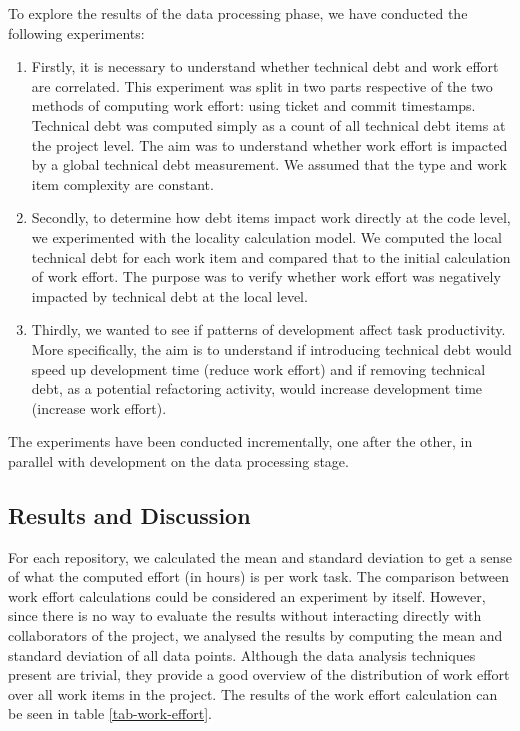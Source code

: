 \documentclass{mpaper}
\begin{document}
To explore the results of the data processing phase, we have conducted the
following experiments:

\begin{enumerate}
  
  \item Firstly, it is necessary to understand whether technical debt and work
  effort are correlated. This experiment was split in two parts respective of
  the two methods of computing work effort: using ticket and commit timestamps.
  Technical debt was computed simply as a count of all technical debt items at
  the project level. The aim was to understand whether work effort is impacted
  by a global technical debt measurement. We assumed that the type and work item
  complexity are constant.

  \item Secondly, to determine how debt items impact work directly at the code
  level, we experimented with the locality calculation model. We computed the
  local technical debt for each work item and compared that to the initial
  calculation of work effort. The purpose was to verify whether work effort was
  negatively impacted by technical debt at the local level. 
  
  \item Thirdly, we wanted to see if patterns of development affect task
  productivity. More specifically, the aim is to understand if introducing
  technical debt would speed up development time (reduce work effort) and if
  removing technical debt, as a potential refactoring activity, would increase
  development time (increase work effort).
\end{enumerate}

The experiments have been conducted incrementally, one after the other, in
parallel with development on the data processing stage.  

\subsection{Results and Discussion}
\label{results-discussion}

For each repository, we calculated the mean and standard deviation to get a
sense of what the computed effort (in hours) is per work task. The comparison
between work effort calculations could be considered an experiment by itself.
However, since there is no way to evaluate the results without interacting
directly with collaborators of the project, we analysed the results by computing
the mean and standard deviation of all data points. Although the data analysis
techniques present are trivial, they provide a good overview of the distribution
of work effort over all work items in the project. The results of the work
effort calculation can be seen in table \ref{tab-work-effort}.  
\end{document}
